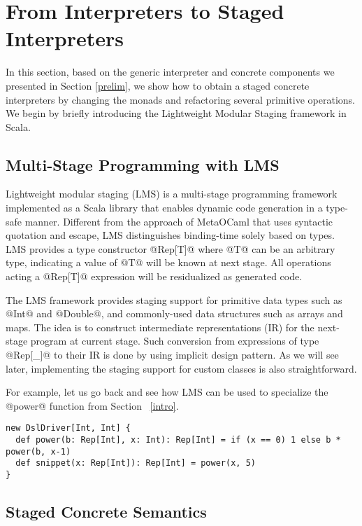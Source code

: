 \section{From Interpreters to Staged Interpreters} \label{stagedinterp}

In this section, based on the generic interpreter and concrete components we
presented in Section \ref{prelim}, we show how to obtain a staged concrete
interpreters by changing the monads and refactoring several primitive
operations. We begin by briefly introducing the Lightweight Modular Staging
framework in Scala.

\subsection{Multi-Stage Programming with LMS}

Lightweight modular staging (LMS) \cite{DBLP:conf/gpce/RompfO10} is a
multi-stage programming framework implemented as a Scala library that enables
dynamic code generation in a type-safe manner. Different from the approach of
MetaOCaml \cite{DBLP:conf/flops/Kiselyov14, DBLP:conf/gpce/CalcagnoTHL03} that
uses syntactic quotation and escape, LMS distinguishes binding-time solely based
on types. LMS provides a type constructor @Rep[T]@ where @T@ can be an arbitrary
type, indicating a value of @T@ will be known at next stage. All operations
acting a @Rep[T]@ expression will be residualized as generated code.

The LMS framework provides staging support for primitive data types such as
@Int@ and @Double@, and commonly-used data structures such as arrays and maps.
The idea is to construct intermediate representations (IR) for the next-stage
program at current stage. Such conversion from expressions of type @Rep[_]@ to
their IR is done by using implicit design pattern. As we will see later,
implementing the staging support for custom classes is also straightforward.

For example, let us go back and see how LMS can be used to specialize the
@power@ function from Section ~\ref{intro}.

\begin{lstlisting}
new DslDriver[Int, Int] {
  def power(b: Rep[Int], x: Int): Rep[Int] = if (x == 0) 1 else b * power(b, x-1)
  def snippet(x: Rep[Int]): Rep[Int] = power(x, 5)
}
\end{lstlisting}


\subsection{Staged Concrete Semantics}

